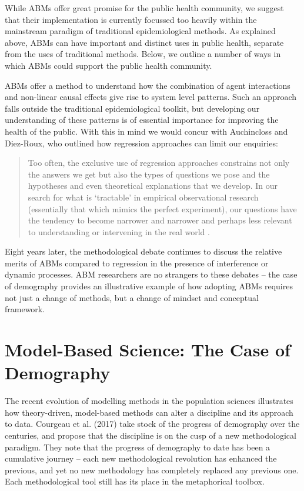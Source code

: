 \documentclass[review]{elsarticle}
\begin{document}
While ABMs offer great promise for the public health community, we suggest that their implementation is currently focussed too heavily within the mainstream paradigm of traditional epidemiological methods. As explained above, ABMs can have important and distinct uses in public health, separate from the uses of traditional methods. Below, we outline a number of ways in which ABMs could support the public health community.

ABMs offer a method to understand how the combination of agent interactions and non-linear causal effects give rise to system level patterns. Such an approach falls outside the traditional epidemiological toolkit, but developing our understanding of these patterns is of essential importance for improving the health of the public. With this in mind we would concur with Auchincloss and Diez-Roux, who outlined how regression approaches can limit our enquiries:

\begin{quote}
Too often, the exclusive use of regression approaches constrains not only the answers we get but also the types of questions we pose and the hypotheses and even theoretical explanations that we develop. In our search for what is `tractable' in empirical observational research (essentially that which mimics the perfect experiment), our questions have the tendency to become narrower and narrower and perhaps less relevant to understanding or intervening in the real world \citep[][p. 6]{auchincloss2008}.
\end{quote}

Eight years later, the methodological debate continues to discuss the relative merits of ABMs compared to regression in the presence of interference or dynamic processes.  ABM researchers are no strangers to these debates -- the case of demography provides an illustrative example of how adopting ABMs requires not just a change of methods, but a change of mindset and conceptual framework.

\section{Model-Based Science: The Case of Demography}

The recent evolution of modelling methods in the population sciences illustrates how theory-driven, model-based methods can alter a discipline and its approach to data.  Courgeau et al. (2017) take stock of the progress of demography over the centuries, and propose that the discipline is on the cusp of a new methodological paradigm.  They note that the progress of demography to date has been a cumulative journey -- each new methodological revolution has enhanced the previous, and yet no new methodology has completely replaced any previous one.  Each methodological tool still has its place in the metaphorical toolbox. 
\end{document}
